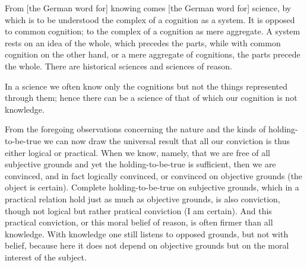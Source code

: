 From [the German word for] knowing comes [the German word for] science,
by which is to be understood the complex of a cognition as a system.
It is opposed to common cognition;
to the complex of a cognition as mere aggregate.
A system rests on an idea of the whole,
which precedes the parts,
while with common cognition on the other hand,
or a mere aggregate of cognitions,
the parts precede the whole.
There are historical sciences and sciences of reason.

In a science we often know only the cognitions
but not the things represented through them;
hence there can be a science of that
of which our cognition is not knowledge.

From the foregoing observations concerning
the nature and the kinds of holding-to-be-true
we can now draw the universal result that
all our conviction is thus either logical or practical.
When we know, namely, that we are free of all subjective grounds and
yet the holding-to-be-true is sufficient,
then we are convinced, and in fact logically convinced, or
convinced on objective grounds (the object is certain).
Complete holding-to-be-true on subjective grounds,
which in a practical relation hold just as much as objective grounds,
is also conviction, though not logical but rather pratical conviction (I am certain).
And this practical conviction, or this moral belief of reason,
is often firmer than all knowledge.
With knowledge one still listens to opposed grounds,
but not with belief, because here it does not depend
on objective grounds but on the moral interest of the subject.
